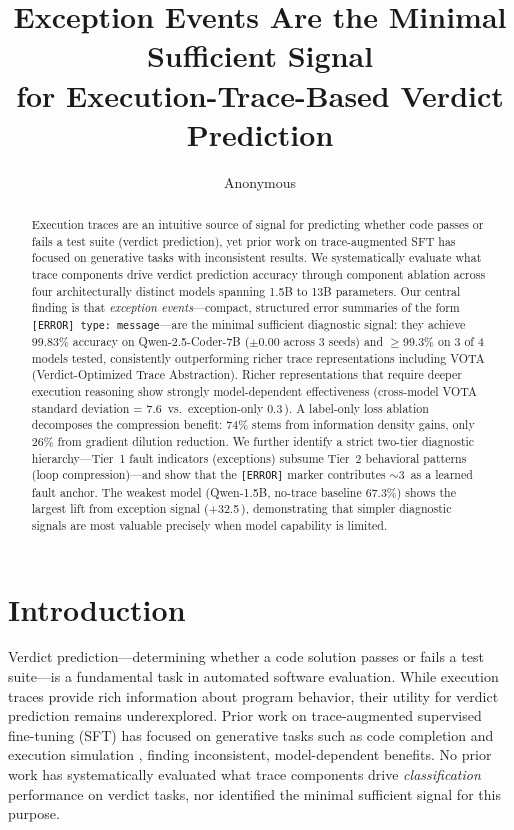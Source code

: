 \documentclass[11pt]{article}
\title{Exception Events Are the Minimal Sufficient Signal\\for Execution-Trace-Based Verdict Prediction}
\author{Anonymous}
\newcommand{\pp}{\,\text{pp}}
\begin{document}
\maketitle

\begin{abstract}
Execution traces are an intuitive source of signal for predicting whether code passes or fails a test suite (verdict prediction), yet prior work on trace-augmented SFT has focused on generative tasks with inconsistent results.
We systematically evaluate what trace components drive verdict prediction accuracy through component ablation across four architecturally distinct models spanning 1.5B to 13B parameters.
Our central finding is that \emph{exception events}---compact, structured error summaries of the form \texttt{[ERROR] type: message}---are the minimal sufficient diagnostic signal: they achieve 99.83\% accuracy on Qwen-2.5-Coder-7B ($\pm$0.00 across 3 seeds) and $\geq$99.3\% on 3 of 4 models tested, consistently outperforming richer trace representations including VOTA (Verdict-Optimized Trace Abstraction).
Richer representations that require deeper execution reasoning show strongly model-dependent effectiveness (cross-model VOTA standard deviation = 7.6\pp{} vs.\ exception-only 0.3\pp).
A label-only loss ablation decomposes the compression benefit: 74\% stems from information density gains, only 26\% from gradient dilution reduction.
We further identify a strict two-tier diagnostic hierarchy---Tier~1 fault indicators (exceptions) subsume Tier~2 behavioral patterns (loop compression)---and show that the \texttt{[ERROR]} marker contributes ${\sim}$3\pp{} as a learned fault anchor.
The weakest model (Qwen-1.5B, no-trace baseline 67.3\%) shows the largest lift from exception signal (+32.5\pp), demonstrating that simpler diagnostic signals are most valuable precisely when model capability is limited.
\end{abstract}

\section{Introduction}
\label{sec:intro}

Verdict prediction---determining whether a code solution passes or fails a test suite---is a fundamental task in automated software evaluation.
While execution traces provide rich information about program behavior, their utility for verdict prediction remains underexplored.
Prior work on trace-augmented supervised fine-tuning (SFT) has focused on generative tasks such as code completion and execution simulation \cite{ni2024dcsh,jain2025tracepile}, finding inconsistent, model-dependent benefits.
No prior work has systematically evaluated what trace components drive \emph{classification} performance on verdict tasks, nor identified the minimal sufficient signal for this purpose.
\end{document}
